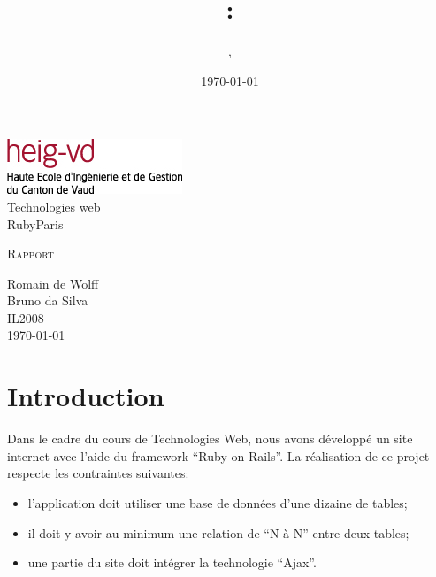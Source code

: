\documentclass[10pt,a4paper,titlepage]{article}
\author{\auteurOne, \auteurTwo}
\title{\branchetag : \laboname}
\date{\today}
\newcommand{\branche}{Technologies web}
\newcommand{\laboname}{RubyParis}
\newcommand{\auteurOne}{Romain de Wolff}
\newcommand{\auteurTwo}{Bruno da Silva}
\newcommand{\promo}{IL2008}
\begin{document}
\pagestyle{headings}
\begin{titlepage}
	\begin{center}
	\includegraphics{imgs/logo-HEIG-VD.jpg}\\
		\vspace{3cm}
		\LARGE \branche %
		\vspace{3cm}\\
		\Huge \laboname \\
		\vspace{3cm}

		\Large \textsc{Rapport} \\
		\vspace{3cm}

		\large \auteurOne \\
		\auteurTwo \\	
		\vspace{10pt}
		\normalsize \textsc{\promo} \\

		\vspace{2cm}
		\today
	\end{center}
\end{titlepage}

\tableofcontents
\newpage
\pagestyle{fancy}

\section{Introduction}
Dans le cadre du cours de Technologies Web, nous avons développé un site internet avec l'aide du framework “Ruby on Rails”. La réalisation de ce projet respecte les contraintes suivantes: \\
\begin{itemize}
	\item {l'application doit utiliser une base de données d'une dizaine de tables;}
	\item {il doit y avoir au minimum une relation de “N à N” entre deux tables;}
	\item {une partie du site doit intégrer la technologie “Ajax”.\\}
\end{itemize}
\end{document}
